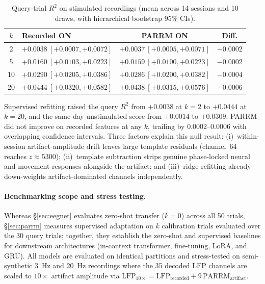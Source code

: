 \documentclass{article}
\begin{document}
\begin{table}[htbp]\centering
\caption{Query-trial $R^2$ on stimulated recordings (mean across 14 sessions and 10 draws, with hierarchical bootstrap 95\% CIs).}
\begin{tabular}{@{}clcc@{}}\toprule
$k$ & Recorded ON & PARRM ON & Diff. \\ \midrule
2  & $+0.0038\ [+0.0007,+0.0072]$ & $+0.0037\ [+0.0005,+0.0071]$ & $-0.0002$ \\
5  & $+0.0160\ [+0.0103,+0.0223]$ & $+0.0159\ [+0.0100,+0.0223]$ & $-0.0002$ \\
10 & $+0.0290\ [+0.0205,+0.0386]$ & $+0.0286\ [+0.0200,+0.0382]$ & $-0.0004$ \\
20 & $+0.0444\ [+0.0320,+0.0582]$ & $+0.0438\ [+0.0315,+0.0576]$ & $-0.0006$ \\
\bottomrule\end{tabular}\label{tab:parrm}
\end{table}

Supervised refitting raised the query $R^2$ from $+0.0038$ at $k=2$ to $+0.0444$ at $k=20$, and the same-day unstimulated score from $+0.0014$ to $+0.0309$. PARRM did not improve on recorded features at any $k$, trailing by $0.0002\text{--}0.0006$ with overlapping confidence intervals. Three factors explain this null result: (i)~within-session artifact amplitude drift leaves large template residuals (channel~64 reaches $z \approx 5300$); (ii)~template subtraction strips genuine phase-locked neural and movement responses alongside the artifact; and (iii)~ridge refitting already down-weights artifact-dominated channels independently.

\paragraph{Benchmarking scope and stress testing.}
Whereas \S\ref{sec:eegnet} evaluates zero-shot transfer ($k=0$) across all 50 trials, \S\ref{sec:parrm} measures supervised adaptation on $k$ calibration trials evaluated over the 30 query trials; together, they establish the zero-shot and supervised baselines for downstream architectures (in-context transformer, fine-tuning, LoRA, and GRU). All models are evaluated on identical partitions and stress-tested on semi-synthetic 3~Hz and 20~Hz recordings where the 35 decoded LFP channels are scaled to $10\times$ artifact amplitude via $\text{LFP}_{10\times} = \text{LFP}_{\text{recorded}} + 9\,\text{PARRM}_{\text{artifact}}$.
\end{document}
